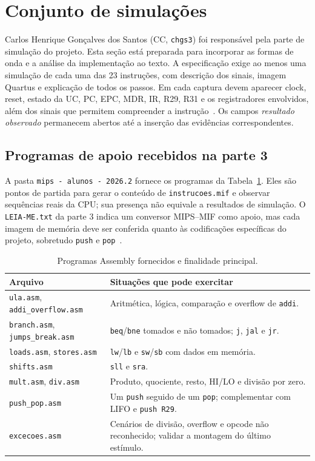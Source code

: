 \section{Conjunto de simulações}\label{sec:simulacoes}

Carlos Henrique Gonçalves dos Santos (CC, \texttt{chgs3}) foi responsável pela parte de simulação do projeto. Esta seção está preparada para incorporar as formas de onda e a análise da implementação ao texto. A especificação exige ao menos uma simulação de cada uma das 23 instruções, com descrição dos sinais, imagem Quartus e explicação de todos os passos. Em cada captura devem aparecer clock, reset, estado da UC, PC, EPC, MDR, IR, R29, R31 e os registradores envolvidos, além dos sinais que permitem compreender a instrução~\cite{especificacao}. Os campos \emph{resultado observado} permanecem abertos até a inserção das evidências correspondentes.

\subsection{Programas de apoio recebidos na parte 3}\label{subsec:programas-pt3}

A pasta \texttt{mips - alunos - 2026.2} fornece os programas da Tabela~\ref{tab:asm-pt3}. Eles são pontos de partida para gerar o conteúdo de \texttt{instrucoes.mif} e observar sequências reais da CPU; sua presença não equivale a resultados de simulação. O \texttt{LEIA-ME.txt} da parte 3 indica um conversor MIPS--MIF como apoio, mas cada imagem de memória deve ser conferida quanto às codificações específicas do projeto, sobretudo \texttt{push} e \texttt{pop}~\cite{docpt3}.

\begin{table}[H]\centering\small
\caption{Programas Assembly fornecidos e finalidade principal.}\label{tab:asm-pt3}
\begin{tabularx}{\linewidth}{@{}p{4cm}X@{}}\toprule
Arquivo & Situações que pode exercitar \\\midrule
\texttt{ula.asm}, \texttt{addi\_overflow.asm} & Aritmética, lógica, comparação e overflow de \texttt{addi}. \\
\texttt{branch.asm}, \texttt{jumps\_break.asm} & \texttt{beq}/\texttt{bne} tomados e não tomados; \texttt{j}, \texttt{jal} e \texttt{jr}. \\
\texttt{loads.asm}, \texttt{stores.asm} & \texttt{lw}/\texttt{lb} e \texttt{sw}/\texttt{sb} com dados em memória. \\
\texttt{shifts.asm} & \texttt{sll} e \texttt{sra}. \\
\texttt{mult.asm}, \texttt{div.asm} & Produto, quociente, resto, HI/LO e divisão por zero. \\
\texttt{push\_pop.asm} & Um \texttt{push} seguido de um \texttt{pop}; complementar com LIFO e \texttt{push R29}. \\
\texttt{excecoes.asm} & Cenários de divisão, overflow e opcode não reconhecido; validar a montagem do último estímulo. \\\bottomrule
\end{tabularx}
\end{table}

